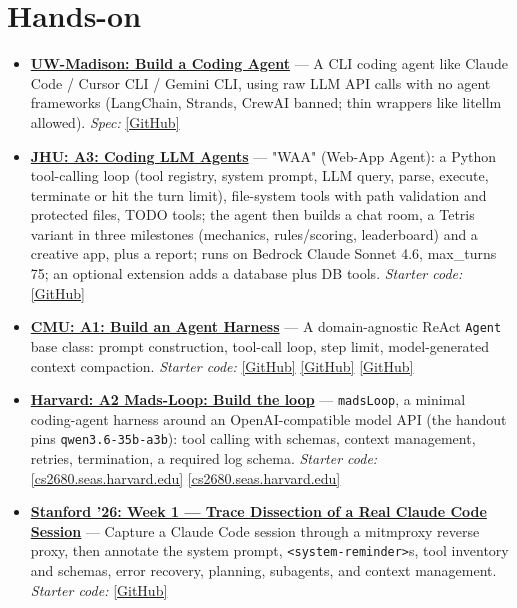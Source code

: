 \documentclass[10pt,oneside]{report}
\begin{document}
\section{Hands-on}
\begin{itemize}
\item \hyperlink{asg-UW-1}{\textbf{UW-Madison: Build a Coding Agent}} --- A CLI coding agent like Claude Code / Cursor CLI / Gemini CLI, using raw LLM API calls with no agent frameworks (LangChain, Strands, CrewAI banned; thin wrappers like litellm allowed). \textit{Spec:} \href{https://github.com/barghouthi/ai-agents/blob/main/assignment.md}{[GitHub]}
\item \hyperlink{asg-JHU-3}{\textbf{JHU: A3: Coding LLM Agents}} --- "WAA" (Web-App Agent): a Python tool-calling loop (tool registry, system prompt, LLM query, parse, execute, terminate or hit the turn limit), file-system tools with path validation and protected files, TODO tools; the agent then builds a chat room, a Tetris variant in three milestones (mechanics, rules/scoring, leaderboard) and a creative app, plus a report; runs on Bedrock Claude Sonnet 4.6, max\_\allowbreak{}turns 75; an optional extension adds a database plus DB tools. \textit{Starter code:} \href{https://github.com/machine-programming/assignment-3}{[GitHub]}
\item \hyperlink{asg-CMU-1}{\textbf{CMU: A1: Build an Agent Harness}} --- A domain-agnostic ReAct \texttt{Agent} base class: prompt construction, tool-call loop, step limit, model-generated context compaction. \textit{Starter code:} \href{https://github.com/cmu-agents/assignment-1}{[GitHub]} \href{https://github.com/cmu-agents/assignment-1/blob/main/ASSIGNMENT.md}{[GitHub]} \href{https://github.com/cmu-agents/chess-app}{[GitHub]}
\item \hyperlink{asg-HARV-2}{\textbf{Harvard: A2 Mads-Loop: Build the loop}} --- \texttt{madsLoop}, a minimal coding-agent harness around an OpenAI-compatible model API (the handout pins \texttt{qwen3.\allowbreak{}6-35b-a3b}): tool calling with schemas, context management, retries, termination, a required log schema. \textit{Starter code:} \href{https://cs2680.seas.harvard.edu/assignments/assignment2.tar.gz}{[cs2680.seas.harvard.edu]} \href{https://cs2680.seas.harvard.edu/assignments/assignment2.html}{[cs2680.seas.harvard.edu]}
\item \hyperlink{asg-STAN26-1}{\textbf{Stanford '26: Week 1 --- Trace Dissection of a Real Claude Code Session}} --- Capture a Claude Code session through a mitmproxy reverse proxy, then annotate the system prompt, \texttt{<system-reminder>}s, tool inventory and schemas, error recovery, planning, subagents, and context management. \textit{Starter code:} \href{https://github.com/mihail911/modern-software-dev-assignments/blob/master/week1/assignment.md}{[GitHub]}

\end{itemize}
\end{document}
